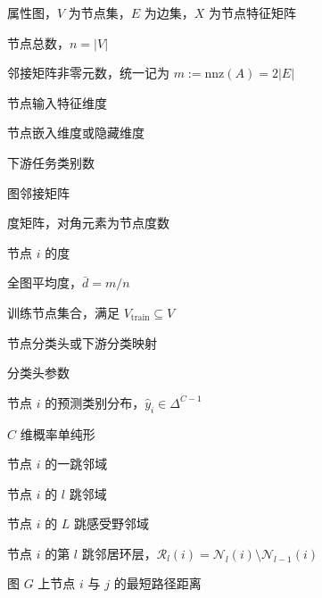 \begin{denotation}[4.0cm]
  \item[$G=(V,E,X)$] 属性图，$V$ 为节点集，$E$ 为边集，$X$ 为节点特征矩阵
  \item[$n$] 节点总数，$n=|V|$
  \item[$m$] 邻接矩阵非零元数，统一记为 $m:=\mathrm{nnz}(A)=2|E|$
  \item[$D$] 节点输入特征维度
  \item[$d$] 节点嵌入维度或隐藏维度
  \item[$C$] 下游任务类别数
  \item[$A$] 图邻接矩阵
  \item[$D_{\mathrm{deg}}$] 度矩阵，对角元素为节点度数
  \item[$d_i$] 节点 $i$ 的度
  \item[$\bar{d}$] 全图平均度，$\bar{d}=m/n$
  \item[$V_{\mathrm{train}}$] 训练节点集合，满足 $V_{\mathrm{train}}\subseteq V$
  \item[$f_{\mathrm{cls}}(\cdot;W_{\mathrm{cls}})$] 节点分类头或下游分类映射
  \item[$W_{\mathrm{cls}}$] 分类头参数
  \item[$\hat{y}_i$] 节点 $i$ 的预测类别分布，$\hat{y}_i\in\Delta^{C-1}$
  \item[$\Delta^{C-1}$] $C$ 维概率单纯形
  \item[$\mathcal{N}(i)$] 节点 $i$ 的一跳邻域
  \item[$\mathcal{N}_l(i)$] 节点 $i$ 的 $l$ 跳邻域
  \item[$\mathcal{N}_L(i)$] 节点 $i$ 的 $L$ 跳感受野邻域
  \item[$\mathcal{R}_l(i)$] 节点 $i$ 的第 $l$ 跳邻居环层，$\mathcal{R}_l(i)=\mathcal{N}_l(i)\setminus \mathcal{N}_{l-1}(i)$
  \item[$d_G(i,j)$] 图 $G$ 上节点 $i$ 与 $j$ 的最短路径距离


\end{denotation}
